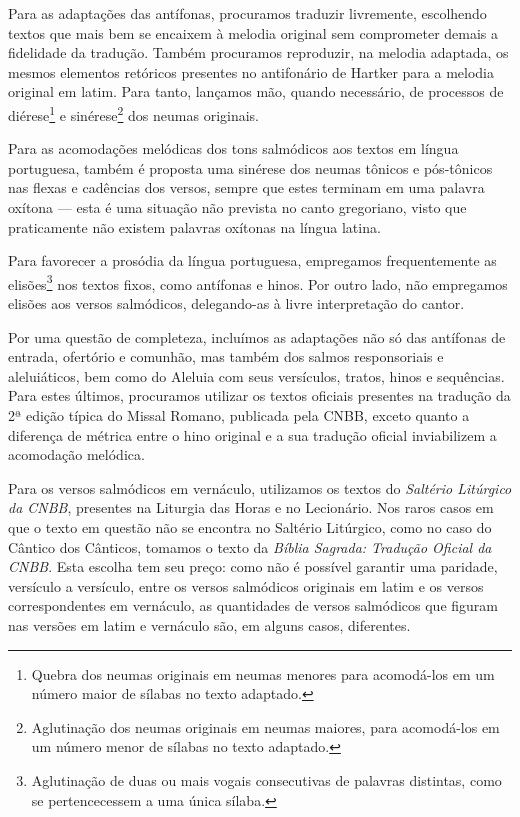 Para as adaptações das antífonas, procuramos traduzir livremente, escolhendo textos que mais bem se encaixem à melodia original sem comprometer demais a fidelidade da tradução. Também procuramos reproduzir, na melodia adaptada, os mesmos elementos retóricos presentes no antifonário de Hartker para a melodia original em latim. Para tanto, lançamos mão, quando necessário, de processos de diérese\footnote{Quebra dos neumas originais em neumas menores para acomodá-los em um número maior de sílabas no texto adaptado.} e sinérese\footnote{Aglutinação dos neumas originais em neumas maiores, para acomodá-los em um número menor de sílabas no texto adaptado.} dos neumas originais.

Para as acomodações melódicas dos tons salmódicos aos textos em língua portuguesa, também é proposta uma sinérese dos neumas tônicos e pós-tônicos nas flexas e cadências dos versos, sempre que estes terminam em uma palavra oxítona --- esta é uma situação não prevista no canto gregoriano, visto que praticamente não existem palavras oxítonas na língua latina.

Para favorecer a prosódia da língua portuguesa, empregamos frequentemente as elisões\footnote{Aglutinação de duas ou mais vogais consecutivas de palavras distintas, como se pertencecessem a uma única sílaba.} nos textos fixos, como antífonas e hinos. Por outro lado, não empregamos elisões aos versos salmódicos, delegando-as à livre interpretação do cantor.

Por uma questão de completeza, incluímos as adaptações não só das antífonas de entrada, ofertório e comunhão, mas também dos salmos responsoriais e aleluiáticos, bem como do Aleluia com seus versículos, tratos, hinos e sequências. Para estes últimos, procuramos utilizar os textos oficiais presentes na tradução da 2ª edição típica do Missal Romano, publicada pela CNBB, exceto quanto a diferença de métrica entre o hino original e a sua tradução oficial inviabilizem a acomodação melódica.

Para os versos salmódicos em vernáculo, utilizamos os textos do \emph{Saltério Litúrgico da CNBB}, presentes na Liturgia das Horas e no Lecionário. Nos raros casos em que o texto em questão não se encontra no Saltério Litúrgico, como no caso do Cântico dos Cânticos, tomamos o texto da \emph{Bíblia Sagrada: Tradução Oficial da CNBB}. Esta escolha tem seu preço: como não é possível garantir uma paridade, versículo a versículo, entre os versos salmódicos originais em latim e os versos correspondentes em vernáculo, as quantidades de versos salmódicos que figuram nas versões em latim e vernáculo são, em alguns casos, diferentes.

